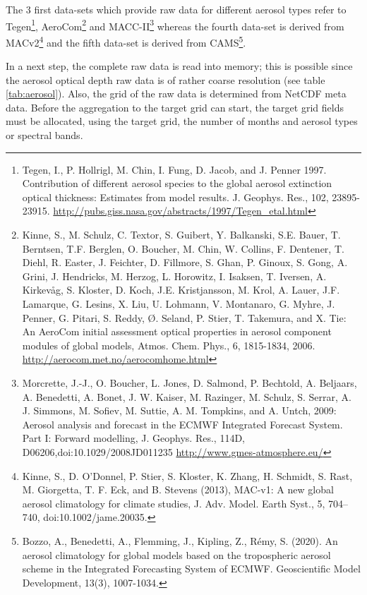 \documentclass[a4paper,10pt,DIV14,BCOR1cm,titlepage,twoside]{scrartcl}
\begin{document}
The 3 first data-sets which provide raw data for different aerosol types refer to Tegen\footnote{Tegen, I., P. Hollrigl, M. Chin, I. Fung, D. Jacob, and J. Penner 1997. Contribution of different aerosol species to the global aerosol extinction optical thickness: Estimates from model results. J. Geophys. Res., 102, 23895-23915. \url{http://pubs.giss.nasa.gov/abstracts/1997/Tegen\_etal.html}}, AeroCom\footnote{Kinne, S., M. Schulz, C. Textor, S. Guibert, Y. Balkanski, S.E. Bauer, T. Berntsen, T.F. Berglen, O. Boucher, M. Chin, W. Collins, F. Dentener, T. Diehl, R. Easter, J. Feichter, D. Fillmore, S. Ghan, P. Ginoux, S. Gong, A. Grini, J. Hendricks, M. Herzog, L. Horowitz, I. Isaksen, T. Iversen, A. Kirkevåg, S. Kloster, D. Koch, J.E. Kristjansson, M. Krol, A. Lauer, J.F. Lamarque, G. Lesins, X. Liu, U. Lohmann, V. Montanaro, G. Myhre, J. Penner, G. Pitari, S. Reddy, Ø. Seland, P. Stier, T. Takemura, and X. Tie: An AeroCom initial assessment optical properties in aerosol component modules of global models, Atmos. Chem. Phys., 6, 1815-1834, 2006. \url{http://aerocom.met.no/aerocomhome.html}} and MACC-II\footnote{Morcrette, J.-J., O. Boucher, L. Jones, D. Salmond, P. Bechtold, A. Beljaars, A. Benedetti, A. Bonet, J. W. Kaiser, M. Razinger, M. Schulz, S. Serrar, A. J. Simmons, M. Sofiev, M. Suttie, A. M. Tompkins, and A. Untch, 2009: Aerosol analysis and forecast in the ECMWF Integrated Forecast System. Part I: Forward modelling, J. Geophys. Res., 114D, D06206,doi:10.1029/2008JD011235 \url{http://www.gmes-atmosphere.eu/}} 
whereas the fourth data-set is derived from MACv2\footnote{Kinne, S., D. O'Donnel, P. Stier, S. Kloster, K. Zhang, H. Schmidt, S. Rast, M. Giorgetta, T. F. Eck, and B. Stevens (2013), MAC-v1: A new global aerosol climatology for climate studies, J. Adv. Model. Earth Syst., 5, 704–740, doi:10.1002/jame.20035.}
and the fifth data-set is derived from CAMS\footnote{Bozzo, A., Benedetti, A., Flemming, J., Kipling, Z.,  Rémy, S. (2020). An aerosol climatology for global models based on the tropospheric aerosol scheme in the Integrated Forecasting System of ECMWF. Geoscientific Model Development, 13(3), 1007-1034.}.\par\medskip\noindent
In a next step, the complete raw data is read into memory; this is possible since the aerosol optical depth raw data is of rather coarse resolution (see table \ref{tab:aerosol}). Also, the grid of the raw data is determined from NetCDF meta data. Before the aggregation to the target grid can start, the target grid fields must be allocated, using the target grid, the number of months and aerosol types or spectral bands.\par\medskip\noindent
\end{document}
